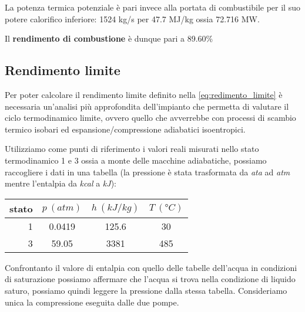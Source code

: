 \documentclass[a4paper,12pt]{article}
\begin{document}
La potenza termica potenziale è pari invece alla portata di combustibile per il suo potere calorifico inferiore:
1524 kg/s per 47.7 MJ/kg ossia 72.716 MW.

Il \textbf{rendimento di combustione} è dunque pari a 89.60\%

\subsection{Rendimento limite}
\label{subsec:rendimento_limite}
Per poter calcolare il rendimento limite definito nella \eqref{eq:redimento_limite} è necessaria un'analisi
più approfondita dell'impianto che permetta di valutare il ciclo termodinamico limite, ovvero quello che avverrebbe
con processi di scambio termico isobari ed espansione/compressione adiabatici isoentropici. 

Utilizziamo come punti di riferimento i valori reali misurati nello stato termodinamico 1 e 3 ossia a monte delle macchine
adiabatiche, possiamo raccogliere i dati in una tabella
(la pressione è stata trasformata da \textit{ata} ad \textit{atm} mentre l'entalpia da \textit{kcal} a \textit{kJ}):
\begin{center}
    \begin{tabular}{r|c|c|c}
        stato    & $p\ (atm)$ & $h\ (kJ/kg)$ & $T\ (\text{°}C) $\\ \hline
        1   &        0.0419 &          125.6   &           30     \\ \hline
        3   &        59.05  &           3381   &           485
    \end{tabular}
\end{center}
Confrontanto il valore di entalpia con quello delle tabelle dell'acqua in condizioni di saturazione possiamo affermare
che l'acqua si trova nella condizione di liquido saturo, possiamo quindi leggere la pressione dalla stessa tabella.
Consideriamo unica la compressione eseguita dalle due pompe.
\end{document}

